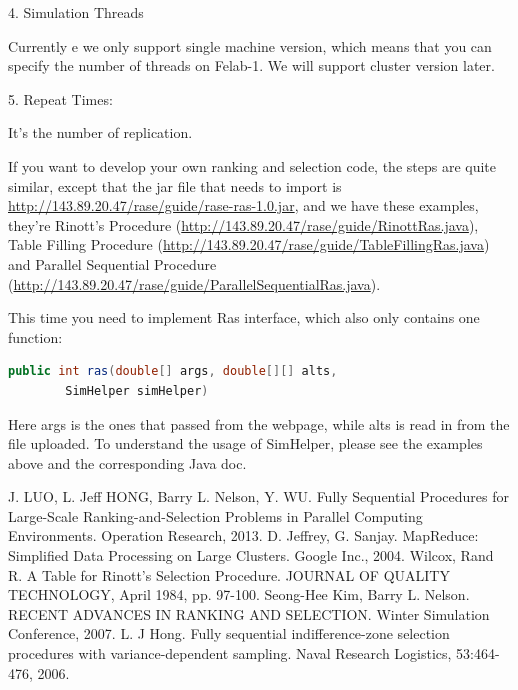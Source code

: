 \documentclass[12pt,a4]{report}
\begin{document}
4.	Simulation Threads

Currently e we only support single machine version, which means that you can specify the number of threads on Felab-1. We will support cluster version later.

5.	Repeat Times:

It’s the number of replication.

If you want to develop your own ranking and selection code, the steps are quite similar, except that the jar file that needs to import is \url{http://143.89.20.47/rase/guide/rase-ras-1.0.jar}, and we have these examples, they’re Rinott’s Procedure (\url{http://143.89.20.47/rase/guide/RinottRas.java}), Table Filling Procedure (\url{http://143.89.20.47/rase/guide/TableFillingRas.java}) and Parallel Sequential Procedure (\url{http://143.89.20.47/rase/guide/ParallelSequentialRas.java}).

This time you need to implement Ras interface, which also only contains one function:

\begin{lstlisting}[language=Java]
public int ras(double[] args, double[][] alts,
        SimHelper simHelper)
\end{lstlisting}

Here args is the ones that passed from the webpage, while alts is read in from the file uploaded. To understand the usage of SimHelper, please see the examples above and the corresponding Java doc.

\newpage
%

%

\begin{thebibliography}{99}
J. LUO, L. Jeff HONG, Barry L. Nelson, Y. WU. Fully Sequential Procedures for Large-Scale Ranking-and-Selection Problems in Parallel Computing Environments. Operation Research, 2013.
D. Jeffrey, G. Sanjay. MapReduce: Simplified Data Processing on Large Clusters. Google Inc., 2004.
Wilcox, Rand R. A Table for Rinott's Selection Procedure. JOURNAL OF QUALITY TECHNOLOGY, April 1984, pp. 97-100.
Seong-Hee Kim, Barry L. Nelson. RECENT ADVANCES IN RANKING AND SELECTION. Winter Simulation Conference, 2007.
L. J Hong. Fully sequential indifference-zone selection procedures with variance-dependent sampling. Naval Research Logistics, 53:464-476, 2006.
\end{thebibliography}
\end{document}
